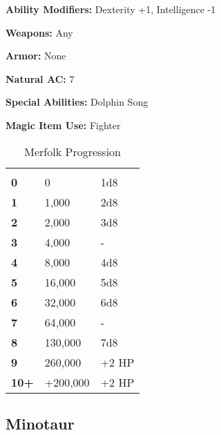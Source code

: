\begin{multicols*}{2}
{\textbf{Ability Modifiers:} Dexterity +1, Intelligence -1

\textbf{Weapons:} Any

\textbf{Armor:} None

\textbf{Natural AC:} 7

\textbf{Special Abilities:} Dolphin Song

\textbf{Magic Item Use:} Fighter}

\begin {table}[H]
  \caption{Merfolk Progression}
  \begin{tabularx}{\columnwidth}{>{\bfseries}YYY}
   &  & \\
	0 & 0 & 1d8\\
	1 & 1,000 & 2d8\\
	2 & 2,000 & 3d8\\
	3 & 4,000 & -\\
	4 & 8,000 & 4d8\\
	5 & 16,000 & 5d8\\
	6 & 32,000 & 6d8\\
	7 & 64,000 & -\\
	8 & 130,000 & 7d8\\
	9 & 260,000 & +2 HP\\
	10+ & +200,000 & +2 HP
  \end {tabularx}
\end {table}

\subsection{Minotaur}
\end{multicols*}

